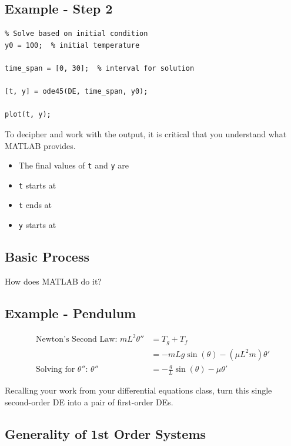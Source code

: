 \newpage

\subsection*{Example - Step 2}
\begin{verbatim}
% Solve based on initial condition
y0 = 100;  % initial temperature

time_span = [0, 30];  % interval for solution

[t, y] = ode45(DE, time_span, y0);

plot(t, y);
\end{verbatim}

\newpage

To decipher and work with the output, it is critical that you
understand what MATLAB provides.  
\begin{itemize}
\item The final values of \verb#t# and \verb#y# are 
\vfill
\item \verb#t# starts at
\vfill
\item \verb#t# ends at
\vfill
\item \verb#y# starts at
\vfill
\end{itemize}

\newpage

\subsection*{Basic Process}
How does MATLAB do it?
\vfill
\vfill

\newpage

\subsection*{Example - Pendulum }
\vfill
\begin{align*}
  \mbox{Newton's Second Law: }   m  L^2 \theta'' & = T_g + T_f  \\
  & = - m L g \sin(\theta) - (\mu L^2 m) \theta' \\
  \mbox{Solving for $\theta''$: }\theta'' & = - \frac{g}{L} \sin(\theta) - \mu 
  \theta'
\end{align*}

\problem Recalling your work from your differential equations class,
  turn this single second-order DE into a pair of first-order DEs.

\vfill

\newpage


\subsection*{Generality of 1st Order Systems}

